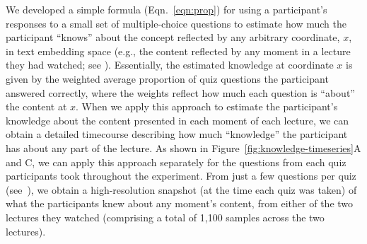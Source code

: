 \documentclass[10pt]{article}
\renewcommand{\nameref}[1]{\mbox{\textit{\oldnameref{#1}}}}
\begin{document}
We developed a simple formula (Eqn.~\ref{eqn:prop}) for using a participant's
responses to a small set of multiple-choice questions to estimate how much the
participant ``knows'' about the concept reflected by any arbitrary coordinate,
$x$, in text embedding space (e.g., the content reflected by any moment in a
lecture they had watched; see \nameref{subsec:traces}). Essentially, the
estimated knowledge at coordinate $x$ is given by the weighted average
proportion of quiz questions the participant answered correctly, where the
weights reflect how much each question is ``about'' the content at $x$. When we
apply this approach to estimate the participant's knowledge about the content
presented in each moment of each lecture, we can obtain a detailed timecourse
describing how much ``knowledge'' the participant has about any part of the
lecture. As shown in Figure~\ref{fig:knowledge-timeseries}A and C, we can apply
this approach separately for the questions from each quiz participants took
throughout the experiment. From just a few questions per quiz
(see~\nameref{subsec:traces}), we obtain a high-resolution snapshot (at the
time each quiz was taken) of what the participants knew about any moment's
content, from either of the two lectures they watched (comprising a total of
1,100 samples across the two lectures).
\end{document}
